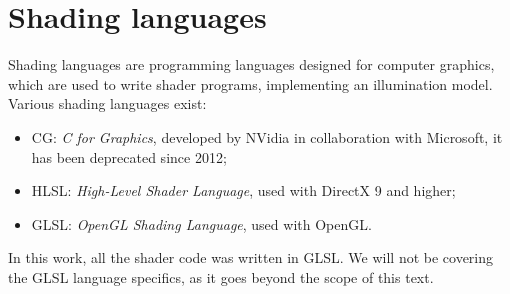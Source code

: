\section{Shading languages}
Shading languages are programming languages designed for computer graphics, which are used to write shader programs, implementing an illumination model. Various shading languages exist:

\begin{itemize}
    \item CG: \emph{C for Graphics}, developed by NVidia in collaboration with Microsoft, it has been deprecated since 2012;
    \item HLSL: \emph{High-Level Shader Language}, used with DirectX 9 and higher;
    \item GLSL: \emph{OpenGL Shading Language}, used with OpenGL.
\end{itemize}

In this work, all the shader code was written in GLSL. We will not be covering the GLSL language specifics, as it goes beyond the scope of this text.
